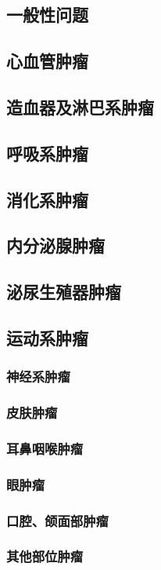 \documentclass[UTF8]{../ApplicationUniverse}
\begin{document}
    \subsection{一般性问题}
    \subsection{心血管肿瘤}
    \subsection{造血器及淋巴系肿瘤}
    \subsection{呼吸系肿瘤}
    \subsection{消化系肿瘤}
    \subsection{内分泌腺肿瘤}
    \subsection{泌尿生殖器肿瘤}
    \subsection{运动系肿瘤}
        \subsubsection{神经系肿瘤}
        \subsubsection{皮肤肿瘤}
        \subsubsection{耳鼻咽喉肿瘤}
        \subsubsection{眼肿瘤}
        \subsubsection{口腔、颌面部肿瘤}
        \subsubsection{其他部位肿瘤}
\end{document}
